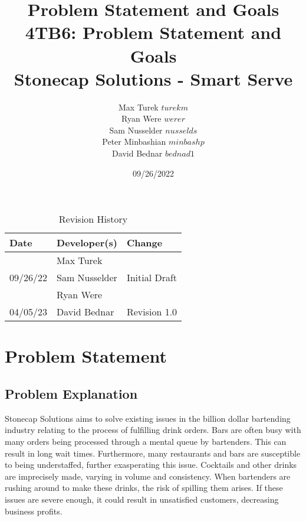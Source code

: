 \documentclass{article}
\title{Problem Statement and Goals\\\progname}
\title{%
\textbf{4TB6: Problem Statement and Goals}\\
\addlinespace
\addlinespace
\addlinespace
\addlinespace
\large \textbf{Stonecap Solutions - Smart Serve}
\addlinespace
\addlinespace
\addlinespace
\addlinespace}
\author{Max Turek $turekm$\\Ryan Were $werer$\\Sam Nusselder $nusselds$\\Peter Minbashian $minbashp$\\David Bednar $bednad1$}
\date{09/26/2022}
\begin{document}
\maketitle
\newpage
\tableofcontents
\addlinespace
\addlinespace
\addlinespace
\addlinespace
\begin{table}[hp]
\caption{Revision History} \label{TblRevisionHistory}
\addlinespace
\addlinespace
\begin{tabularx}{\textwidth}{llX}
\toprule
\textbf{Date} & \textbf{Developer(s)} & \textbf{Change}\\
\midrule
 & Max Turek & \\
09/26/22 & Sam Nusselder & Initial Draft \\
  & Ryan Were & \\
\bottomrule
\toprule
04/05/23 & David Bednar & Revision 1.0 \\
\bottomrule
\end{tabularx}
\end{table}

\newpage

\section{Problem Statement}

\subsection{Problem Explanation}
Stonecap Solutions aims to solve existing issues in the billion dollar bartending industry relating to the process of fulfilling drink orders. Bars are often busy with many orders being processed through a mental queue by bartenders. This can result in long wait times. Furthermore, many restaurants and bars are susceptible to being understaffed, further exasperating this issue. Cocktails and other drinks are imprecisely made, varying in volume and consistency. When bartenders are rushing around to make these drinks, the risk of spilling them arises. If these issues are severe enough, it could result in unsatisfied customers, decreasing business profits.

\end{document}
